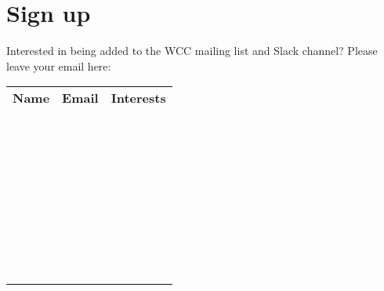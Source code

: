 \documentclass[a4paper,landscape]{article}
\begin{document}
\section*{Sign up}

Interested in being added to the WCC mailing list and Slack channel? Please leave your email here:
\newline
\begin{center}
\begin{tabular*}{.95\linewidth}{@{\extracolsep{\fill}}lll}
 \textbf{Name} & \textbf{Email} & \textbf{Interests}\\
 \\
 \hline
 &&\\\\\\
 \hline
 &&\\\\\\
 \hline
 &&\\\\\\
 \hline
 &&\\\\\\
 \hline
 &&\\\\\\
 \hline
 &&\\\\\\
 \hline
 &&\\\\\\
 \hline
 &&\\\\\\
 \hline
 &&\\\\\\
 \hline
 &&\\\\\\
 \hline
 &&\\\\\\
 \hline
 &&\\\\\\
 \hline
\end{tabular*}
\end{center}
\end{document}
